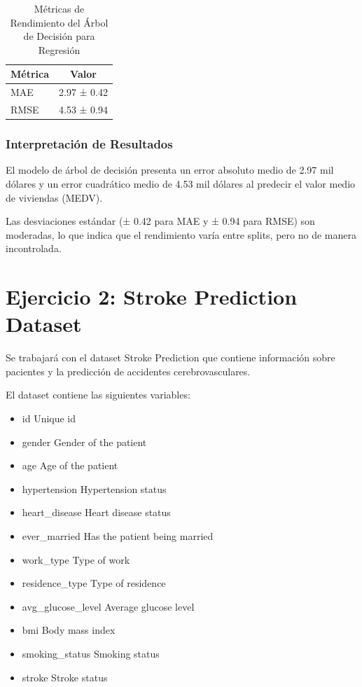 \documentclass[12pt,a4paper]{article}
\begin{document}
\begin{table}[H]
\centering
\caption{Métricas de Rendimiento del Árbol de Decisión para Regresión}\label{tab:dtree_resultados}
\begin{tabular}{lc}
\toprule
\textbf{Métrica} & \textbf{Valor} \\
\midrule
MAE & 2.97 ± 0.42 \\
RMSE & 4.53 ± 0.94 \\
\bottomrule
\end{tabular}
\end{table}

\subsubsection{Interpretación de Resultados}

El modelo de árbol de decisión presenta un error absoluto medio de 2.97 mil dólares y un error cuadrático medio de 4.53 mil dólares al predecir el valor medio de viviendas (MEDV).

Las desviaciones estándar (± 0.42 para MAE y ± 0.94 para RMSE) son moderadas, lo que indica que el rendimiento varía entre splits, pero no de manera incontrolada.

\section{Ejercicio 2: Stroke Prediction Dataset}

Se trabajará con el dataset Stroke Prediction que contiene información sobre pacientes y la predicción de accidentes cerebrovasculares.

El dataset contiene las siguientes variables:
\begin{itemize}
\item id     Unique id
\item gender       Gender of the patient
\item age          Age of the patient
\item hypertension Hypertension status 
\item heart_disease Heart disease status 
\item ever_married Has the patient being married 
\item work_type    Type of work 
\item residence_type Type of residence 
\item avg_glucose_level Average glucose level
\item bmi          Body mass index
\item smoking_status Smoking status
\item stroke       Stroke status 
\end{itemize}
\end{document}

